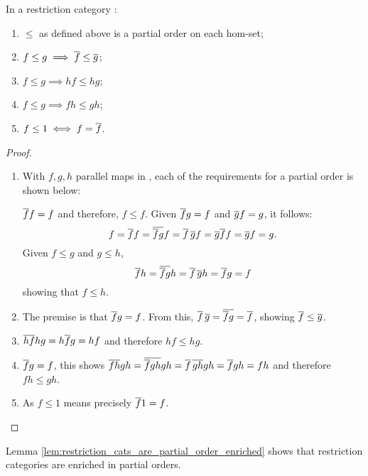 \begin{lemma}\label{lem:restriction_cats_are_partial_order_enriched}
  In a restriction category \X:
  \begin{enumerate}[{(}i{)}]
    \item  $\le$ as defined  above is a partial order on each hom-set;
    \item $f \le g \implies \overline{f} \le \overline{g}$;
    \item $f \le g \implies h f \le h g$;
    \item $f \le g \implies f h \le g h$;
    \item $f \le 1 \iff f = \overline{f}$.
  \end{enumerate}
\end{lemma}
\begin{proof}
  \prepprooflist
  \begin{enumerate}[{(}i{)}]
    \item With $f,g,h$ parallel maps in \X, each of the requirements for a partial order is
      shown below:
      \begin{description}
         $\overline{f} f = f$ and therefore, $ f \le f$.
         Given $\overline{f}g = f$ and $\overline{g}f = g$, it follows:
          \[
            f = \overline{f} f = \overline{\overline{f} g} f = \overline{f}\, \overline{g} f
            = \overline{g}\overline{f} f =  \overline{g} f = g.
          \]
         Given $f \le g$ and $g\le h$,
          \[
            \overline{f} h = \overline{\overline{f} g} h = \overline{f}\, \overline{g} h = \overline{f} g = f
          \]
          showing that $f \le h$.
      \end{description}
    \item The premise is that $\overline{f} g = f$. From this,
      $ \overline{f}\, \overline{g} = \overline{\overline{f} g} = \overline{f}$, showing
      $\overline{f} \le \overline{g}$.
    \item $\overline{h f} hg = h \overline{f} g = h f$ and therefore $h f \le hg$.
    \item $\overline{f} g = f$, this shows  $\overline{f h} g h = \overline{\overline{f} g h} g h
      = \overline{f}\, \overline{g h} g h = \overline{f} g h = f h$ and therefore $f h \le g h$.
    \item As $f \le 1$ means precisely $\overline{f}1 = f$.
  \end{enumerate}
\end{proof}

Lemma \vref{lem:restriction_cats_are_partial_order_enriched} shows that restriction
categories are enriched in partial orders.

